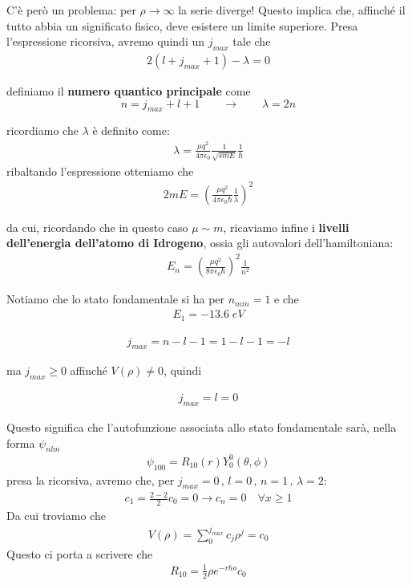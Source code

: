 C'è però un problema: per $\rho \rightarrow \infty$ la serie diverge! Questo implica che, affinché il tutto abbia un significato fisico, deve esistere un limite superiore. Presa l'espressione ricorsiva, avremo quindi un $j_{max}$ tale che
\begin{align}
2(l + j_{max} +1) - \lambda=0
\end{align}

definiamo il \textbf{numero quantico principale} come
\begin{equation}
n= j_{max} + l + 1 \qquad \rightarrow \qquad \lambda = 2n
\end{equation}

ricordiamo che $\lambda$ è definito come:
\begin{align}
\lambda = \frac{\mu q^2}{4 \pi \epsilon_0} \frac{1}{\sqrt{smE}}\frac{1}{\hbar}
\end{align}
ribaltando l'espressione otteniamo che
\begin{align}
2mE= \left( \frac{\mu q^2}{4 \pi \epsilon_0 \hbar} \frac{1}{\lambda} \right)^2 
\end{align}

da cui, ricordando che in questo caso $\mu \sim m$, ricaviamo infine i \textbf{livelli dell'energia dell'atomo di Idrogeno}, ossia gli autovalori dell'hamiltoniana:
\begin{align}
E_n= \left( \frac{\mu q^2}{8 \pi \epsilon_0 \hbar} \right)^2 \frac{1}{n^2}
\end{align}

Notiamo che lo stato fondamentale si ha per $n_{min}=1$ e che 
\begin{align}
E_1= -13.6 \; eV
\end{align}

\begin{align}
j_{max}= n-l-1 = 1-l -1=-l
\end{align}

ma $j_{max} \geq 0$ affinché $V(\rho) \neq 0$, quindi 

\begin{align}
j_{max}=l=0
\end{align}

Questo significa che l'autofunzione associata allo stato fondamentale sarà, nella forma $\psi_{nlm}$
\begin{align}
\psi_{100}= R_{10}(r)Y_0^0(\theta, \phi) 
\end{align}
presa la ricorsiva, avremo che, per $j_{max} = 0 \, , \, l=0\, , \, n=1 \, , \, \lambda=2$:
\begin{align}
 c_1 = \frac{2-2}{2}c_0=0 \rightarrow c_n=0 \quad \forall x \geq 1
\end{align}
Da cui troviamo che
\begin{align}
V(\rho)= \sum_0^{j_{max}} c_j\rho^j = c_0
\end{align}
Questo ci porta a scrivere che
\begin{align}
R_{1 0}= \frac{1}{2}\rho e^{-rho}c_0
\end{align}

